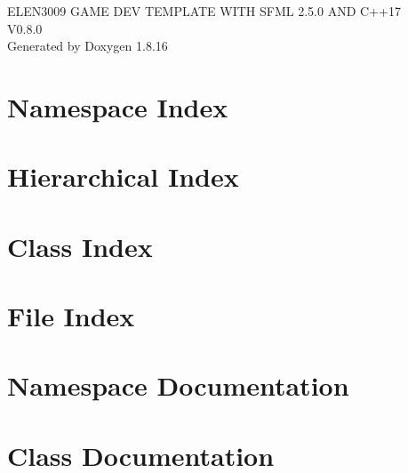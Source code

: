 \let\mypdfximage\pdfximage\def\pdfximage{\immediate\mypdfximage}\documentclass[twoside]{book}
\newcommand{\+}{\discretionary{\mbox{\scriptsize$\hookleftarrow$}}{}{}}
\newcommand{\clearemptydoublepage}{%
  \newpage{\pagestyle{empty}\cleardoublepage}%
}
\begin{document}
\hypersetup{pageanchor=false,
             bookmarksnumbered=true,
             pdfencoding=unicode
            }
\begin{titlepage}
\vspace*{7cm}
\begin{center}%
{\Large E\+L\+E\+N3009 G\+A\+ME D\+EV T\+E\+M\+P\+L\+A\+TE W\+I\+TH S\+F\+ML 2.5.0 A\+ND C++17 \\[1ex]\large V0.\+8.\+0 }\\
\vspace*{1cm}
{\large Generated by Doxygen 1.8.16}\\
\end{center}
\end{titlepage}
\clearemptydoublepage
{}
\tableofcontents
\clearemptydoublepage
{}
\hypersetup{pageanchor=true}

\chapter{Namespace Index}

\chapter{Hierarchical Index}

\chapter{Class Index}

\chapter{File Index}

\chapter{Namespace Documentation}




\chapter{Class Documentation}



































\end{document}
